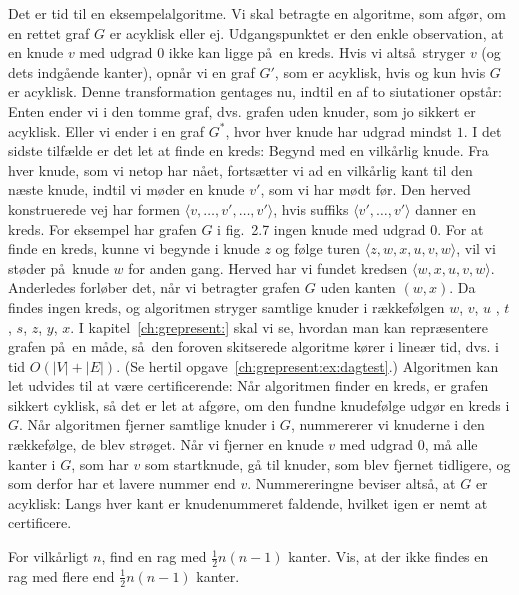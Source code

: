 Det er tid til en eksempelalgoritme.
Vi skal betragte en algoritme, som afgør, om en rettet graf $G$ er acyklisk eller ej.
Udgangspunktet er den enkle observation, at en knude $v$ med udgrad $0$ ikke kan ligge på en kreds.
Hvis vi altså stryger $v$ (og dets indgående kanter), opnår vi en graf $G'$, som er acyklisk, hvis og kun hvis $G$ er acyklisk.
Denne transformation gentages nu, indtil en af to siutationer opstår:
Enten ender vi i den tomme graf, dvs. grafen uden knuder, som jo sikkert er acyklisk.
Eller vi ender i en graf $G^*$, hvor hver knude har udgrad mindst $1$.
I det sidste tilfælde er det let at finde en kreds:
Begynd med en vilkårlig knude.
Fra hver knude, som vi netop har nået, fortsætter vi ad en vilkårlig kant til den næste knude, indtil vi møder en knude $v'$, som vi har mødt før.
Den herved konstruerede vej har formen $\langle v, \ldots, v',\ldots, v'\rangle$, hvis suffiks $\langle v',\ldots,v'\rangle$ danner en kreds.
For eksempel har grafen $G$ i fig.~2.7 ingen knude med udgrad $0$.
For at finde en kreds, kunne vi begynde i knude $z$ og følge turen $\langle z,w,x,u,v,w\rangle$, vil vi støder på knude $w$ for anden gang.
Herved har vi fundet kredsen $\langle w,x,u,v,w\rangle$.
Anderledes forløber det, når vi betragter grafen $G$ uden kanten $(w,x)$.
Da findes ingen kreds, og algoritmen stryger samtlige knuder i rækkefølgen $w$, $v$, $u$ , $t$, $s$, $z$, $y$, $x$.
I kapitel~\ref{ch:grepresent:} skal vi se, hvordan man kan repræsentere grafen på en måde, så den foroven skitserede algoritme kører i lineær tid, dvs. i tid $O(|V|+|E|)$.
(Se hertil opgave~\ref{ch:grepresent:ex:dagtest}.)
Algoritmen kan let udvides til at være certificerende:
Når algoritmen finder en kreds, er grafen sikkert cyklisk, så det er let at afgøre, om den fundne knudefølge udgør en kreds i $G$.
Når algoritmen fjerner samtlige knuder i $G$, nummererer vi knuderne i den rækkefølge, de blev strøget.
Når vi fjerner en knude $v$ med udgrad $0$, må alle kanter i $G$, som har $v$ som startknude, gå til knuder, som blev fjernet tidligere, og som derfor har et lavere nummer end $v$. 
Nummereringne beviser altså, at $G$ er acyklisk:
Langs hver kant er knudenummeret faldende, hvilket igen er nemt at certificere.

\begin{exerc}
For vilkårligt $n$, find en rag med $\frac{1}{2}n(n-1)$ kanter.
Vis, at der ikke findes en rag med flere end $\frac{1}{2}n(n-1)$ kanter.
\end{exerc}

